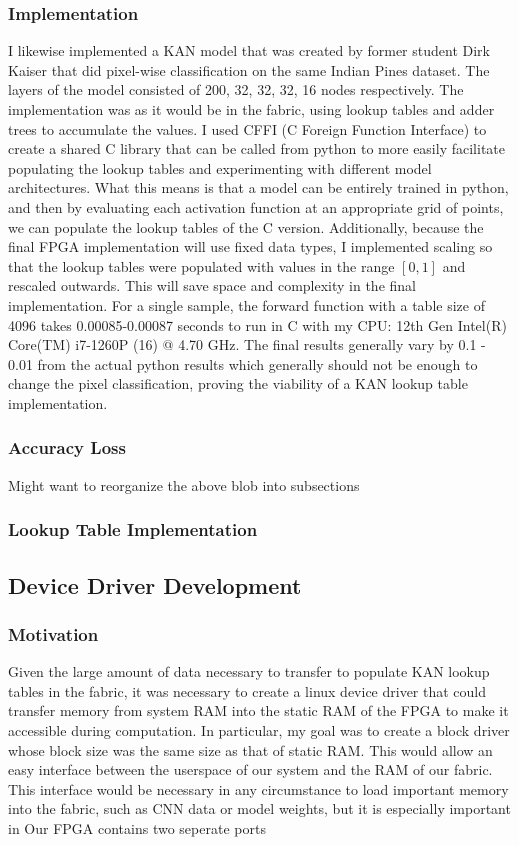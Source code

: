 \documentclass{article}
\begin{document}
\subsubsection{Implementation}
I likewise implemented a KAN model that was created by former student Dirk Kaiser that did pixel-wise classification on the same Indian Pines dataset. The layers of the model consisted of 200, 32, 32, 32, 16 nodes respectively. The implementation was as it would be in the fabric, using lookup tables and adder trees to accumulate the values. I used CFFI (C Foreign Function Interface) to create a shared C library that can be called from python to more easily facilitate populating the lookup tables and experimenting with different model architectures. What this means is that a model can be entirely trained in python, and then by evaluating each activation function at an appropriate grid of points, we can populate the lookup tables of the C version. Additionally, because the final FPGA implementation will use fixed data types, I implemented scaling so that the lookup tables were populated with values in the range $[0,1]$ and rescaled outwards. This will save space and complexity in the final implementation. For a single sample, the forward function with a table size of 4096 takes 0.00085-0.00087 seconds to run in C with my CPU: 12th Gen Intel(R) Core(TM) i7-1260P (16) @ 4.70 GHz. The final results generally vary by 0.1 - 0.01 from the actual python results which generally should not be enough to change the pixel classification, proving the viability of a KAN lookup table implementation.

\subsubsection{Accuracy Loss}
Might want to reorganize the above blob into subsections

\subsubsection{Lookup Table Implementation}

\subsection{Device Driver Development}

\subsubsection{Motivation}
Given the large amount of data necessary to transfer to populate KAN lookup tables in the fabric, it was necessary to create a linux device driver that could transfer memory from system RAM into the static RAM of the FPGA to make it accessible during computation. In particular, my goal was to create a block driver whose block size was the same size as that of static RAM. This would allow an easy interface between the userspace of our system and the RAM of our fabric. This interface would be necessary in any circumstance to load important memory into the fabric, such as CNN data or model weights, but it is especially important in Our FPGA contains two seperate ports
\end{document}
